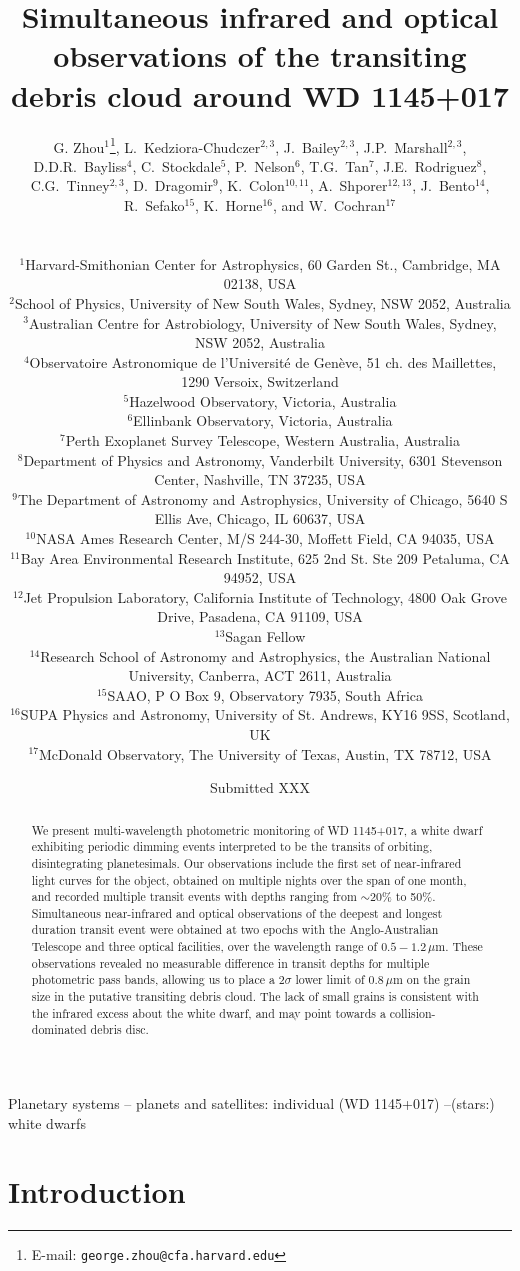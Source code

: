 \documentclass[useAMS,usenatbib]{mn2e}
\title[Simultaneous multi-band transits of WD 1145+017]{Simultaneous infrared and optical observations of the transiting debris cloud around WD 1145+017}
\author[Zhou et al.]
{\parbox{\textwidth}
  {G. Zhou$^{1}$\thanks{E-mail: \texttt{george.zhou@cfa.harvard.edu}},
L.~Kedziora-Chudczer$^{2,3}$,
J.~Bailey$^{2,3}$,
J.P.~Marshall$^{2,3}$,
D.D.R.~Bayliss$^{4}$,
C.~Stockdale$^{5}$,
P.~Nelson$^{6}$,
T.G.~Tan$^{7}$,
J.E.~Rodriguez$^{8}$,
C.G.~Tinney$^{2,3}$,
D.~Dragomir$^{9}$,
K.~Colon$^{10,11}$,
A.~Shporer$^{12,13}$,
J.~Bento$^{14}$,
R.~Sefako$^{15}$,
K.~Horne$^{16}$, and
W.~Cochran$^{17}$
\vspace{0.4cm}}\\
\parbox{\textwidth}{
$^{1}${Harvard-Smithonian Center for Astrophysics, 60 Garden St., Cambridge, MA 02138, USA}\\
$^{2}${School of Physics, University of New South Wales, Sydney, NSW 2052, Australia}\\
$^{3}${Australian Centre for Astrobiology, University of New South Wales, Sydney, NSW 2052, Australia}\\
$^{4}${Observatoire Astronomique de l'Universit\'{e} de Gen\`{e}ve, 51 ch. des Maillettes, 1290 Versoix, Switzerland}\\
$^{5}${Hazelwood Observatory, Victoria, Australia}\\
$^{6}${Ellinbank Observatory, Victoria, Australia}\\
$^{7}${Perth Exoplanet Survey Telescope, Western Australia, Australia}\\
$^{8}${Department of Physics and Astronomy, Vanderbilt University, 6301 Stevenson Center, Nashville, TN 37235, USA}\\
$^{9}${The Department of Astronomy and Astrophysics, University of Chicago, 5640 S Ellis Ave, Chicago, IL 60637, USA}\\
$^{10}${NASA Ames Research Center, M/S 244-30, Moffett Field, CA 94035, USA}\\
$^{11}${Bay Area Environmental Research Institute, 625 2nd St. Ste 209 Petaluma, CA 94952, USA}\\
$^{12}${Jet Propulsion Laboratory, California Institute of Technology, 4800 Oak Grove Drive, Pasadena, CA 91109, USA}\\
$^{13}${Sagan Fellow}\\
$^{14}${Research School of Astronomy and Astrophysics, the Australian National University, Canberra, ACT 2611, Australia}\\
$^{15}${SAAO, P O Box 9, Observatory 7935, South Africa}\\
$^{16}${SUPA Physics and Astronomy, University of St. Andrews, KY16 9SS, Scotland, UK}\\
$^{17}${McDonald Observatory, The University of Texas, Austin, TX 78712, USA}\\
}}
\begin{document}
\date{Submitted XXX}

\pagerange{\pageref{firstpage}--\pageref{lastpage}} 

\maketitle

\label{firstpage}


\begin{abstract}
We present multi-wavelength photometric monitoring of WD 1145+017, a white dwarf exhibiting periodic dimming events interpreted to be the transits of orbiting, disintegrating planetesimals. Our observations include the first set of near-infrared light curves for the object, obtained on multiple nights over the span of one month, and recorded multiple transit events with depths ranging from $\sim 20$\% to 50\%. Simultaneous near-infrared and optical observations of the deepest and longest duration transit event were obtained at two epochs with the Anglo-Australian Telescope and three optical facilities, over the wavelength range of $0.5-1.2\,\mu\mathrm{m}$. These observations revealed no measurable difference in transit depths for multiple photometric pass bands, allowing us to place a $2\sigma$ lower limit of $0.8\,\mu\mathrm{m}$ on the grain size in the putative transiting debris cloud. The lack of small grains is consistent with the infrared excess about the white dwarf, and may point towards a collision-dominated debris disc.
\end{abstract}

\begin{keywords}
Planetary systems -- planets and satellites: individual (WD 1145+017) --(stars:) white dwarfs
\end{keywords}

\section{Introduction}
\label{sec:introduction}
\end{document}
